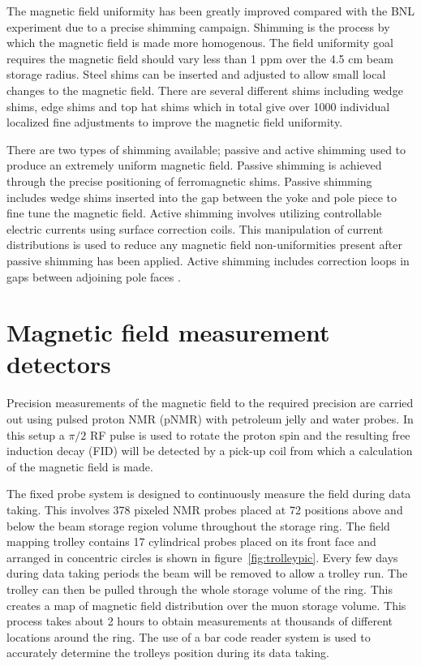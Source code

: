 The magnetic field uniformity has been greatly improved compared with the BNL experiment due to a precise shimming campaign. Shimming is the process by which the magnetic field is made more homogenous. The field uniformity goal requires the magnetic field should vary less than 1 ppm over the 4.5 cm beam storage radius. Steel shims can be inserted and adjusted to allow small local changes to the magnetic field. There are several different shims including wedge shims, edge shims and top hat shims which in total give over 1000 individual localized fine adjustments to improve the magnetic field uniformity.

There are two types of shimming available; passive and active shimming used to produce an extremely uniform magnetic field. Passive shimming is achieved through the precise positioning of ferromagnetic shims. Passive shimming includes wedge shims inserted into the gap between the yoke and pole piece to fine tune the magnetic field. Active shimming involves utilizing controllable electric currents using surface correction coils. This manipulation of current distributions is used to reduce any magnetic field non-uniformities present after passive shimming has been applied. Active shimming includes correction loops in gaps between adjoining pole faces \cite{magref4}\cite{Reference27}.

\section{Magnetic field measurement detectors}

Precision measurements of the magnetic field to the required precision are carried out using pulsed proton NMR (pNMR) with petroleum jelly and water probes. In this setup a $\pi/2$ RF pulse is used to rotate the proton spin and the resulting free induction decay (FID) will be detected by a pick-up coil from which a calculation of the magnetic field is made.

The fixed probe system is designed to continuously measure the field during data taking. This involves 378 pixeled NMR probes placed at 72 positions above and below the beam storage region volume throughout the storage ring. The field mapping trolley contains 17 cylindrical probes placed on its front face and arranged in concentric circles is shown in figure~\ref{fig:trolleypic}. Every few days during data taking periods the beam will be removed to allow a trolley run. The trolley can then be pulled through the whole storage volume of the ring. This creates a map of magnetic field distribution over the muon storage volume. This process takes about 2 hours to obtain measurements at thousands of different locations around the ring. The use of a bar code reader system is used to accurately determine the trolleys position during its data taking.   

